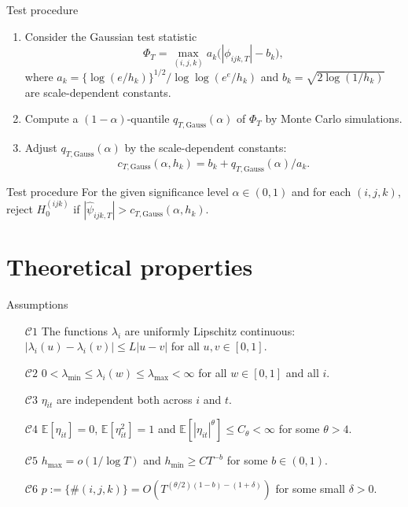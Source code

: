 \documentclass[10pt]{beamer}
\newcommand{\E}{\mathbb{E}}
\begin{document}
\begin{frame}[label = frame_test]{Test procedure}

\begin{enumerate}
	\item Consider the Gaussian test statistic 
	\vspace{-2mm} \[ \Phi_T = \max_{(i,j,k)} a_k \big( |\phi_{ijk,T}| - b_k \big), \] where $a_k = \{\log(e/h_k)\}^{1/2} / \log \log(e^e / h_k)$ and $b_k = \sqrt{2 \log(1/h_k)}$ are scale-dependent constants.\pause
	\item Compute a $(1-\alpha)$-quantile $q_{T, \text{Gauss}} (\alpha)$ of $\Phi_T$ by Monte Carlo simulations.\pause
	\item Adjust $q_{T, \text{Gauss}} (\alpha)$ by the scale-dependent constants: \[c_{T,\text{Gauss}}(\alpha,h_k) = b_k + q_{T,\text{Gauss}}(\alpha)/a_k.\] \pause
\end{enumerate}
\vspace{-5mm}
\begin{block}{Test procedure}
For the given significance level $\alpha \in (0,1)$ and for each $(i,j,k)$, reject $H_0^{(ijk)}$ if $|\widehat{\psi}_{ijk,T}| > c_{T,\text{Gauss}}(\alpha,h_k)$.
\end{block}
\end{frame}

\section{Theoretical properties}
\begin{frame}{Assumptions}
\begin{itemize}
\item[$\mathcal{C}1$] \label{C1} The functions $\lambda_i$ are uniformly Lipschitz continuous: $|\lambda_i(u) - \lambda_i(v)| \le L |u-v|$ for all $u, v \in [0,1]$.
\item[$\mathcal{C}2$] \label{C2} $0 < \lambda_{\min} \le \lambda_i(w) \le \lambda_{\max} < \infty$ for all $w \in [0, 1]$ and all $i$. 
\item[$\mathcal{C}3$] \label{C3} $\eta_{it}$ are independent both across $i$ and $t$.
\item[$\mathcal{C}4$] \label{C4} $\E[\eta_{it}] = 0$, $\E[\eta_{it}^2] = 1$ and $\E[|\eta_{it}|^\theta] \le C_\theta < \infty$ for some $\theta > 4$. 
\item[$\mathcal{C}5$] \label{C5} $h_{\max} = o(1/\log T)$ and $h_{\min} \ge CT^{-b}$ for some $b \in (0,1)$.
\item[$\mathcal{C}6$] \label{C6} $p := \{ \# (i, j, k) \} = O(T^{(\theta/2)(1-b)-(1+\delta)})$ for some small $\delta > 0$.
\end{itemize}
\end{frame}
\end{document}
